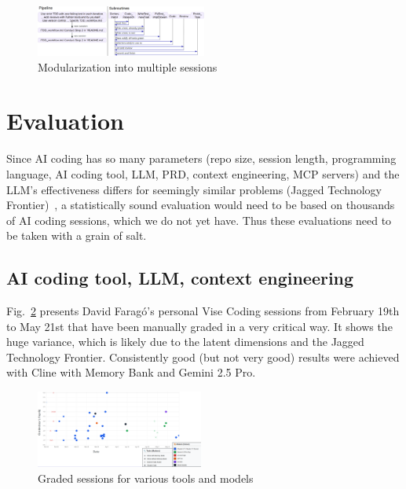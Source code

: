 \documentclass[twocolumn]{article}
\begin{document}
\begin{figure}[hbt!]
  \begin{center}
  \vspace{-2mm}
  \includegraphics[width=0.499\textwidth]{figures/pipeline_vs_subtask_v3}
  \vspace{-8mm}
\caption{Modularization into multiple sessions}
\label{fig:pipelinesubtask}
\end{center}
\end{figure}

\section{Evaluation}

Since AI coding has so many parameters (repo size, session length, programming language, AI coding tool, LLM,
PRD, context engineering, MCP servers)
and the LLM's effectiveness differs for seemingly similar problems (Jagged Technology Frontier)~\cite{FD23},
a statistically sound evaluation would need to be based on thousands of AI coding sessions, which we do not yet have.
Thus these evaluations need to be taken with a grain of salt.

\subsection{AI coding tool, LLM, context engineering}
\label{sec:gradedsessions}

Fig.~\ref{fig:toolsmodels} presents David Farag\'{o}'s personal Vise Coding sessions from February 19th to May 21st that have been manually graded in a very critical way.
It shows the huge variance, which is likely due to the latent dimensions and the Jagged Technology Frontier.
Consistently good (but not very good) results were achieved with Cline with Memory Bank and Gemini 2.5 Pro.

\begin{figure}[hbt!]
  \begin{center}
  \vspace{-2mm}
  \includegraphics[width=0.49\textwidth]{figures/tools_models_v1}
  \vspace{-7mm}
\caption{Graded sessions for various tools and models}
\label{fig:toolsmodels}
\end{center}
\end{figure}
\end{document}
